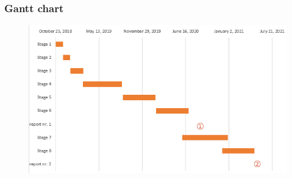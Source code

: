 \documentclass{beamer}
\begin{document}

 \begin{frame}
\frametitle{Gantt chart}

\begin{figure}[H]
\centering
\includegraphics[width=\textwidth]{gantt_plot.PNG}
\label{fig:gantt2}
\end{figure}

\end{frame}
\end{document}
